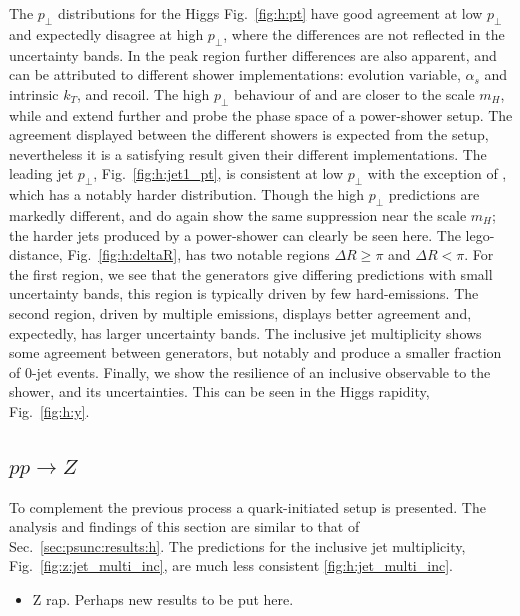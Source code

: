 The $p_\perp$ distributions for the Higgs Fig.~\ref{fig:h:pt} have good agreement at low $p_\perp$ and expectedly disagree at high $p_\perp$, where the differences are not reflected in the uncertainty bands. In the peak region further differences are also apparent, and can be attributed to different shower implementations: evolution variable, $\alpha_s$ and intrinsic $k_T$, and recoil. The high $p_\perp$ behaviour of \Herwig and \Sherpa \CSS are closer to the scale $m_H$, while \Pythia and \Sherpa \Dire extend further and probe the phase space of a power-shower setup. The agreement displayed between the different \Herwig showers is expected from the setup, nevertheless it is a satisfying result given their different implementations.
The leading jet $p_\perp$, Fig.~\ref{fig:h:jet1_pt}, is consistent at low $p_\perp$ with the exception of \Pythia, which has a notably harder distribution. Though the high $p_\perp$ predictions are markedly different, \Herwig and \Sherpa \CSS do again show the same suppression near the scale $m_H$; the harder jets produced by a power-shower can clearly be seen here.
The lego-distance, Fig.~\ref{fig:h:deltaR}, has two notable regions $\Delta R \geq\pi$ and $\Delta R < \pi$. For the first region, we see that the generators give differing predictions with small uncertainty bands, this region is typically driven by few hard-emissions. The second region, driven by multiple emissions, displays better agreement and, expectedly, has larger uncertainty bands.
The inclusive jet multiplicity shows some agreement between generators, but notably \Sherpa \CSS and \Pythia produce a smaller fraction of $0$-jet events. Finally, we show the resilience of an inclusive observable to the shower, and its uncertainties. This can be seen in the Higgs rapidity, Fig.~\ref{fig:h:y}.

\subsection{$pp\to Z$}
\label{sec:psunc:results:z}
To complement the previous process a quark-initiated setup is presented. The analysis and findings of this section are similar to that of Sec.~\ref{sec:psunc:results:h}. The predictions for the inclusive jet multiplicity, Fig.~\ref{fig:z:jet_multi_inc}, are much less consistent \ref{fig:h:jet_multi_inc}.

\begin{itemize}
  \item \Pythia Z rap. Perhaps new results to be put here.
\end{itemize}


